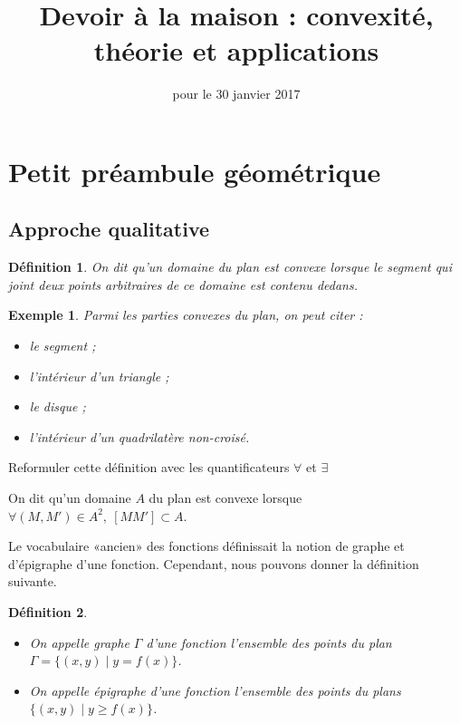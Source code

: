 \documentclass[12pt,a4paper,french]{article}
\title{Devoir à la maison \no{3} : convexité, théorie et applications}
\author{\bsc{Ts 3}}
\date{pour le 30 janvier 2017}
\makeatletter
\renewcommand{\maketitle}%
{\framebox{%
    \begin{minipage}{1.0\linewidth}%
      \begin{center}%
        \Large \@title ~-- \@author \\%
        \@date%
      \end{center}%
    \end{minipage}}%
  \normalsize%
}
\theoremstyle{break}
\newtheorem{definition}{Définition}
\theoremstyle{plain}
\theoremstyle{nonumberplain}
\theoremstyle{nonumberbreak}
\newtheorem{exemple}{Exemple}
\makeatother
\begin{document}
\maketitle

\section{Petit préambule géométrique}

\subsection{Approche qualitative}

\begin{definition}
  On dit qu'un domaine du plan est convexe lorsque le segment qui joint
  deux points arbitraires de ce domaine est contenu dedans.
\end{definition}

\begin{exemple}
  Parmi les parties convexes du plan, on peut citer :
  \begin{itemize}
    \item le segment ;
    \item l'intérieur d'un triangle ;
    \item le disque ;
    \item l'intérieur d'un quadrilatère non-croisé.
  \end{itemize}
\end{exemple}

\begin{question}[ID=reformulation]
  Reformuler cette définition avec les quantificateurs $\forall$ et
  $\exists$
\end{question}
\begin{solution}
  On dit qu'un domaine $A$ du plan est convexe lorsque $\forall (M,M')
  \in A^2,\ [MM']\subset A$.
\end{solution}

Le vocabulaire «ancien» des fonctions définissait la notion de graphe et
d'épigraphe d'une fonction. Cependant, nous pouvons donner la définition
suivante.
\begin{definition}
  \begin{itemize}
    \item On appelle graphe $\Gamma$ d'une fonction l'ensemble des
      points du plan $\Gamma = \lbrace (x,y) \mid y = f(x) \rbrace$.
    \item On appelle épigraphe d'une fonction l'ensemble des points du
      plans $\lbrace (x,y) \mid y \geqslant f(x)\rbrace$.
  \end{itemize}
\end{definition}
\end{document}
